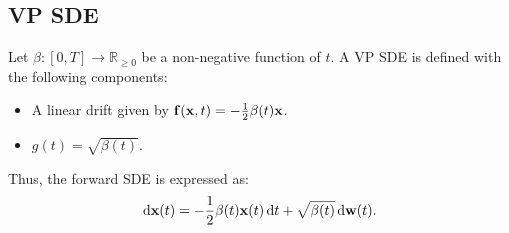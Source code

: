 


\subsection{VP SDE}
Let $\beta\colon [0,T] \rightarrow \mathbb{R}_{\geq 0 }$ be a non-negative function of $t$. A VP SDE is defined with the following components:
\begin{itemize}
    \item {} A linear drift given by $\mathbf{f}({\mathbf{x}}, t) = -\frac{1}{2}\beta(t){\mathbf{x}}$.
    \item {} $g(t) = \sqrt{\beta(t)}$.
\end{itemize}
Thus, the forward SDE is expressed as:
\begin{align}\label{eq:forward-linear-sde}
\mathop{}\!\mathrm{d}{\mathbf{x}}(t) = -\frac{1}{2}\beta(t) {\mathbf{x}}(t) \mathop{}\!\mathrm{d} t + \sqrt{\beta(t)} \mathop{}\!\mathrm{d}{\mathbf{w}}(t).
\end{align}

